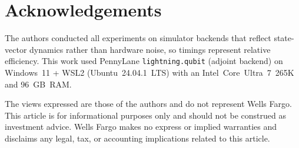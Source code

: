 \documentclass{article}
\begin{document}
\section*{Acknowledgements}
The authors conducted all experiments on simulator backends that reflect state-vector dynamics rather than hardware noise, so timings represent relative efficiency. This work used PennyLane \texttt{lightning.qubit} (adjoint backend) on Windows~11 + WSL2 (Ubuntu~24.04.1~LTS) with an Intel~Core~Ultra~7~265K and 96~GB~RAM.

The views expressed are those of the authors and do not represent Wells Fargo. This article is for informational purposes only and should not be construed as investment advice. Wells Fargo makes no express or implied warranties and disclaims any legal, tax, or accounting implications related to this article.




\end{document}
